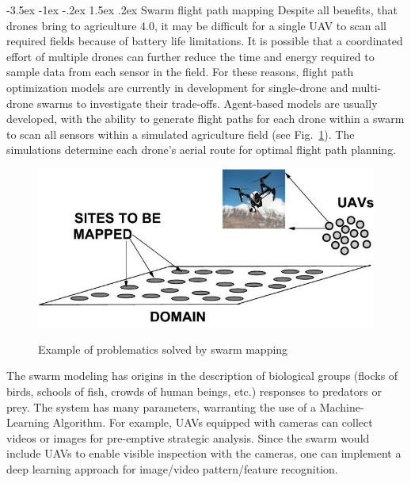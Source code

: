\documentclass[a4paper,10pt]{article}
\makeatletter
\theoremstyle{definition}
\renewcommand\section{\@startsection {section}{1}{\z@}%
                                   {-3.5ex \@plus -1ex \@minus -.2ex}%
                                   {1.5ex \@plus.2ex}%
                                   {\large\bfseries}}
\makeatother
\begin{document}
\section{Swarm flight path mapping}
\label{sec:3}
Despite all benefits, that drones bring to agriculture 4.0, it may be difficult for a single UAV to scan all required fields because of battery life limitations. It is possible that a coordinated effort of multiple drones can further reduce the time and energy required to sample data from each sensor in the field. For these reasons, flight path optimization models are currently in development for single-drone and multi-drone swarms to investigate their trade-offs. Agent-based models are usually developed, with the ability to generate flight paths for each drone within a swarm to scan all sensors within a simulated agriculture field (see Fig.~\ref{fig:6}). The simulations determine each drone’s aerial route for optimal flight path planning.
\cite{GOODRICH2023107591,agricultureswarm}

\begin{figure}[h]
\begin{center}
\includegraphics[scale=0.35]{images/ezgif.com-webp-to-jpg.jpg}
\caption{Example of problematics solved by swarm mapping}\cite{agricultureswarm}
\label{fig:6}
\end{center}
\end{figure}

The swarm modeling has origins in the description of biological groups (flocks of birds, schools of fish, crowds of human beings, etc.) responses to predators or prey. The system has many parameters, warranting the use of a Machine-Learning Algorithm. For example, UAVs equipped with cameras can collect videos or images for pre-emptive strategic analysis. Since the swarm would include UAVs to enable visible inspection with the cameras, one can implement a deep learning approach for image/video pattern/feature recognition. \cite{GOODRICH2023107591,agricultureswarm}
\end{document}
